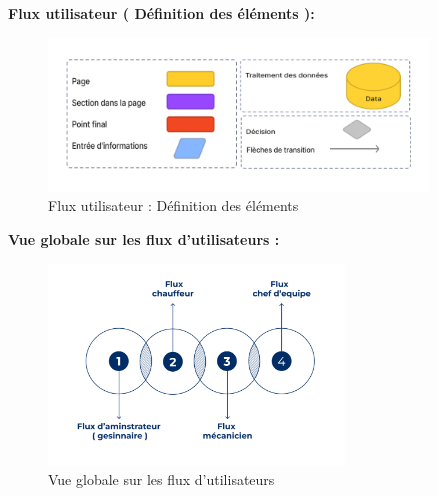 \bigskip
\textbf{Flux utilisateur ( Définition des éléments ):}
\begin{figure}[htbp]
  \centering
  \includegraphics[width=0.9\textwidth]{chap2.images/user flow ( Définition des éléments ).png}
  \caption{Flux utilisateur : Définition des éléments}
\end{figure}


\bigskip
\textbf{Vue globale sur les flux d’utilisateurs :}
\begin{figure}[htbp]
  \centering
  \includegraphics[width=0.7\textwidth]{chap2.images/vue global user flow.png}
  \caption{Vue globale sur les flux d'utilisateurs}
\end{figure}




\newpage

